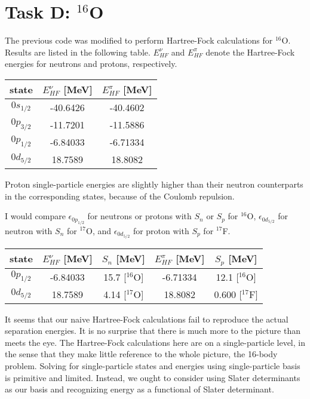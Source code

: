 \documentclass[11pt, oneside]{article}   	%
\begin{document}
\section{Task D: $^{16}$O}
The previous code was modified to perform Hartree-Fock calculations for $^{16}$O. Results are listed in the following table. $E_{HF}^{\nu}$ and $E_{HF}^{\pi}$ denote the Hartree-Fock energies for neutrons and protons, respectively.
\begin{table}[H]
  \centering
\begin{tabular}{ccc}
  \toprule
	state & \textit{$E_{HF}^{\nu}$} [MeV] & \textit{$E_{HF}^{\pi}$} [MeV] \\
  \midrule
	$0s_{1/2}$ & -40.6426 & -40.4602\\
	$0p_{3/2}$ & -11.7201 & -11.5886 \\
	$0p_{1/2}$ & -6.84033 & -6.71334 \\
	$0d_{5/2}$ & 18.7589 & 18.8082 \\   
	\bottomrule
  \end{tabular}
\end{table}

Proton single-particle energies are slightly higher than their neutron counterparts in the corresponding states, because of the Coulomb repulsion.

I would compare $\epsilon_{0p_{1/2}}$ for neutrons or protons with $S_n$ or $S_p$ for $^{16}$O, $\epsilon_{0d_{5/2}}$ for neutron with $S_n$ for $^{17}$O, and $\epsilon_{0d_{5/2}}$ for proton with $S_p$ for $^{17}$F.

\begin{table}[H]
  \centering
\begin{tabular}{ccccc}
  \toprule
	state & \textit{$E_{HF}^{\nu}$} [MeV] & $S_n$ [MeV] & \textit{$E_{HF}^{\pi}$} [MeV] & $S_p$ [MeV] \\
  \midrule
	$0p_{1/2}$ & -6.84033 & 15.7 [$^{16}$O] & -6.71334 & 12.1 [$^{16}$O] \\
	$0d_{5/2}$ & 18.7589 & 4.14 [$^{17}$O] & 18.8082 & 0.600 [$^{17}$F] \\    
	\bottomrule
  \end{tabular}
\end{table}

It seems that our naive Hartree-Fock calculations fail to reproduce the actual separation energies. It is no surprise that there is much more to the picture than meets the eye. The Hartree-Fock calculations here are on a single-particle level, in the sense that they make little reference to the whole picture, the 16-body problem. Solving for single-particle states and energies using single-particle basis is primitive and limited. Instead, we ought to consider using Slater determinants as our basis and recognizing energy as a functional of Slater determinant. 
\end{document}
